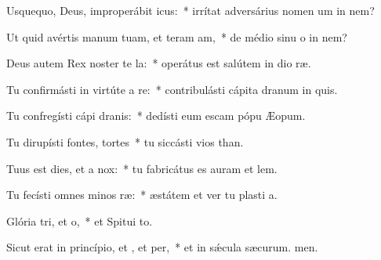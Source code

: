 \item Usquequo, Deus, improperábit icus:~* irrítat adversárius nomen um in nem?
\item Ut quid avértis manum tuam, et teram am,~* de médio sinu o in nem?
\item Deus autem Rex noster te la:~* operátus est salútem in dio ræ.
\item Tu confirmásti in virtúte a re:~* contribulásti cápita dranum in quis.
\item Tu confregísti cápi dranis:~* dedísti eum escam pópu Æopum.
\item Tu dirupísti fontes,  tortes~* tu siccásti vios than.
\item Tuus est dies, et a  nox:~* tu fabricátus es auram et lem.
\item Tu fecísti omnes minos ræ:~* æstátem et ver tu plasti a.
\item Glória tri, et o,~* et Spitui to.
\item Sicut erat in princípio, et , et per,~* et in sǽcula sæcurum. men.
